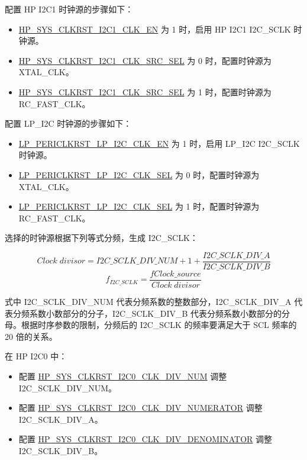 \documentclass[main\_\_CN.tex]{subfiles}
\begin{document}
配置 HP I2C1 时钟源的步骤如下：

\begin{itemize}
    \item \hyperref[fielddesc:HPSYSCLKRSTI2C1CLKEN]{HP\_SYS\_CLKRST\_I2C1\_CLK\_EN} 为 1 时，启用 HP I2C1 I2C\_SCLK 时钟源。
    \item \hyperref[fielddesc:HPSYSCLKRSTI2C1CLKSRCSEL]{HP\_SYS\_CLKRST\_I2C1\_CLK\_SRC\_SEL} 为 0 时，配置时钟源为 XTAL\_CLK。
    \item \hyperref[fielddesc:HPSYSCLKRSTI2C1CLKSRCSEL]{HP\_SYS\_CLKRST\_I2C1\_CLK\_SRC\_SEL} 为 1 时，配置时钟源为 RC\_FAST\_CLK。
\end{itemize}

配置 LP\_I2C 时钟源的步骤如下：

\begin{itemize}
    \item \hyperref[fielddesc:LPPERICLKRSTLPI2CCLKEN]{LP\_PERICLKRST\_LP\_I2C\_CLK\_EN} 为 1 时，启用 LP\_I2C I2C\_SCLK 时钟源。
    \item \hyperref[fielddesc:LPPERICLKRSTLPI2CCLKSEL]{LP\_PERICLKRST\_LP\_I2C\_CLK\_SEL} 为 0 时，配置时钟源为 XTAL\_CLK。
    \item \hyperref[fielddesc:LPPERICLKRSTLPI2CCLKSEL]{LP\_PERICLKRST\_LP\_I2C\_CLK\_SEL} 为 1 时，配置时钟源为 RC\_FAST\_CLK。
\end{itemize}

选择的时钟源根据下列等式分频，生成 I2C\_SCLK：

    \[
        {Clock\;divisor} = I2C\_SCLK\_DIV\_NUM + 1+\frac{I2C\_SCLK\_DIV\_A}{I2C\_SCLK\_DIV\_B}
    \]
    \[
        f_{I2C\_SCLK}=\frac{fClock\_source_{}}{Clock\;divisor}
    \]

式中 I2C\_SCLK\_DIV\_NUM 代表分频系数的整数部分，I2C\_SCLK\_DIV\_A 代表分频系数小数部分的分子，I2C\_SCLK\_DIV\_B 代表分频系数小数部分的分母。根据时序参数的限制，分频后的 I2C\_SCLK 的频率要满足大于 SCL 频率的 20 倍的关系。

在 HP I2C0 中：

\begin{itemize}
    \item 配置 \hyperref[fielddesc:HPSYSCLKRSTI2C0CLKDIVNUM]{HP\_SYS\_CLKRST\_I2C0\_CLK\_DIV\_NUM} 调整 I2C\_SCLK\_DIV\_NUM。
    \item 配置 \hyperref[fielddesc:HPSYSCLKRSTI2C0CLKDIVNUMERATOR]{HP\_SYS\_CLKRST\_I2C0\_CLK\_DIV\_NUMERATOR} 调整 I2C\_SCLK\_DIV\_A。
    \item 配置 \hyperref[fielddesc:HPSYSCLKRSTI2C0CLKDIVDENOMINATOR]{HP\_SYS\_CLKRST\_I2C0\_CLK\_DIV\_DENOMINATOR} 调整 I2C\_SCLK\_DIV\_B。
\end{itemize}
\end{document}
